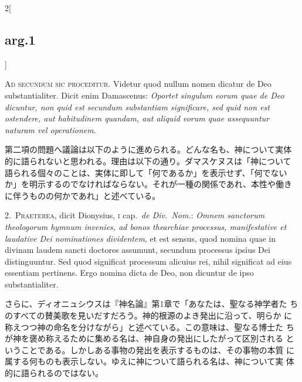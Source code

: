 \documentclass[paper=a4paper,fontsize=10pt,jafontsize=9pt,titlepage]{jlreq}
\begin{document}
\begin{paracol}{2}[\subsection{arg.1}]

{\scshape Ad secundum sic proceditur}. Videtur quod nullum nomen dicatur de
Deo substantialiter. Dicit enim Damascenus: {\itshape Oportet singulum
eorum quae de Deo dicuntur, non quid est secundum substantiam
significare, sed quid non est ostendere, aut habitudinem quandam, aut
aliquid eorum quae assequuntur naturam vel operationem}.

\switchcolumn

第二項の問題へ議論は以下のように進められる。どんな名も、神について実体
的に語られないと思われる。理由は以下の通り。ダマスケヌスは「神について
語られる個々のことは、実体に即して「何であるか」を表示せず、「何でない
か」を明示するのでなければならない。それが一種の関係であれ、本性や働き
に伴うものの何かであれ」と述べている。


2.~{\scshape Praeterea}, dicit Dionysius, {\scshape i} cap.\ {\itshape de Div.\
Nom.}: {\itshape Omnem sanctorum theologorum hymnum invenies, ad bonos
thearchiae processus, manifestative et laudative Dei nominationes
dividentem}, et est sensus, quod nomina quae in divinam laudem sancti
doctores assumunt, secundum processus ipsius Dei distinguuntur. Sed
quod significat processum alicuius rei, nihil significat ad eius
essentiam pertinens. Ergo nomina dicta de Deo, non dicuntur de ipso
substantialiter.

\switchcolumn

さらに、ディオニュシウスは『神名論』第1章で「あなたは、聖なる神学者た
ちのすべての賛美歌を見いだすだろう。神的根源のよき発出に沿って、明らか
に称えつつ神の命名を分けながら」と述べている。この意味は、聖なる博士た
ちが神を褒め称えるために集める名は、神自身の発出にしたがって区別される
ということである。しかしある事物の発出を表示するものは、その事物の本質
に属する何ものも表示しない。ゆえに神について語られる名は、神について実
体的に語られるのではない。



\end{paracol}
\end{document}
